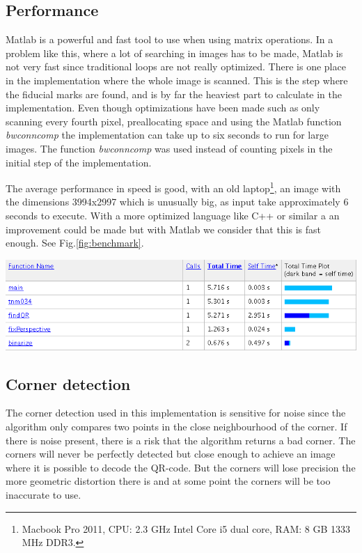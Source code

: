 \documentclass[12pt,a4paper]{article}
\newenvironment{Figure}
  {\par\medskip\noindent\minipage{\linewidth}}
  {\endminipage\par\medskip}
\begin{document}
\subsection{Performance}
Matlab is a powerful and fast tool to use when using matrix operations. In a problem like this, where a lot of searching in images has to be made, Matlab is not very fast since traditional loops are not really optimized. There is one place in the implementation where the whole image is scanned. This is the step where the fiducial marks are found, and is by far the heaviest part to calculate in the implementation. Even though optimizations have been made such as only scanning every fourth pixel, preallocating space and using the Matlab function \textit{bwconncomp} the implementation can take up to six seconds to run for large images. The function \textit{bwconncomp} was used instead of counting pixels in the initial step of the implementation. 

The average performance in speed is good, with an old laptop\footnote{Macbook Pro 2011, CPU: 2.3 GHz Intel Core i5 dual core, RAM: 8 GB 1333 MHz DDR3.}, an image with the dimensions 3994x2997 which is unusually big, as input take approximately 6 seconds to execute. With a more optimized language like C++ or similar a an improvement could be made but with Matlab we consider that this is fast enough. See Fig.\ref{fig:benchmark}.

\begin{Figure}
  \centering
    \includegraphics[width=1.0\linewidth]{./img/benchmark.png}
\end{Figure}


\subsection{Corner detection}
The corner detection used in this implementation is sensitive for noise since the algorithm only compares two points in the close neighbourhood of the corner. If there is noise present, there is a risk that the algorithm returns a bad corner. The corners will never be perfectly detected but close enough to achieve an image where it is possible to decode the QR-code. But the corners will lose precision the more geometric distortion there is and at some point the corners will be too inaccurate to use.
\end{document}
